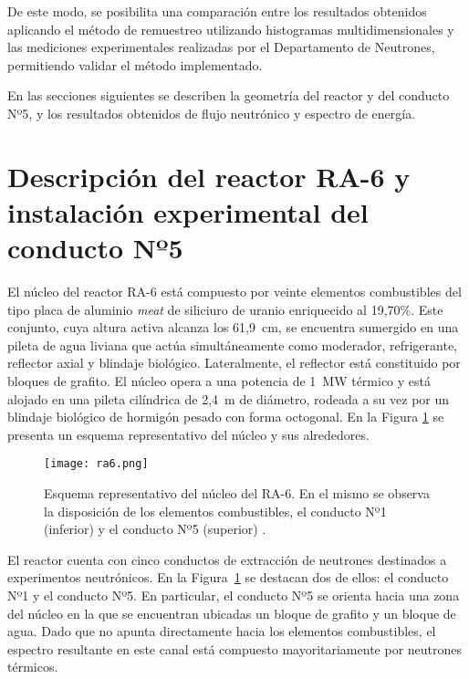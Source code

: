 De este modo, se posibilita una comparación entre los resultados obtenidos aplicando el método de remuestreo utilizando histogramas multidimensionales y las mediciones experimentales realizadas por el Departamento de Neutrones, permitiendo validar el método implementado.

En las secciones siguientes se describen la geometría del reactor y del conducto Nº5, y los resultados obtenidos de flujo neutrónico y espectro de energía.

\section{Descripción del reactor RA-6 y instalación experimental del conducto Nº5}

El núcleo del reactor RA-6 está compuesto por veinte elementos combustibles del tipo placa de aluminio \textit{meat} de siliciuro de uranio enriquecido al 19,70\%. Este conjunto, cuya altura activa alcanza los 61,9~cm, se encuentra sumergido en una pileta de agua liviana que actúa simultáneamente como moderador, refrigerante, reflector axial y blindaje biológico. Lateralmente, el reflector está constituido por bloques de grafito. El núcleo opera a una potencia de 1~MW térmico y está alojado en una pileta cilíndrica de 2,4~m de diámetro, rodeada a su vez por un blindaje biológico de hormigón pesado con forma octogonal. En la Figura \ref{fig:esquema-nucleo} se presenta un esquema representativo del núcleo y sus alrededores.

\begin{figure}[h]
\centering
\texttt{[image: ra6.png]}
\caption[Esquema representativo del núcleo del RA-6. En el mismo se observa la disposición de los elementos combustibles, el conducto Nº1 (inferior) y el conducto Nº5 (superior).]{Esquema representativo del núcleo del RA-6. En el mismo se observa la disposición de los elementos combustibles, el conducto Nº1 (inferior) y el conducto Nº5 (superior) \cite{Schmidt2021Chopper}.}
\label{fig:esquema-nucleo}
\end{figure}

El reactor cuenta con cinco conductos de extracción de neutrones destinados a experimentos neutrónicos. En la Figura~\ref{fig:esquema-nucleo} se destacan dos de ellos: el conducto Nº1 y el conducto Nº5. En particular, el conducto Nº5 se orienta hacia una zona del núcleo en la que se encuentran ubicadas un bloque de grafito y un bloque de agua. Dado que no apunta directamente hacia los elementos combustibles, el espectro resultante en este canal está compuesto mayoritariamente por neutrones térmicos.

